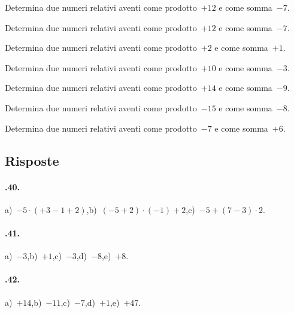 \begin{multicols}{2}
\begin{esercizio}
 Determina due numeri relativi aventi come prodotto~$+12$ e come somma~$-7$.
\end{esercizio}

\begin{esercizio}
 Determina due numeri relativi aventi come
prodotto~$+12$ e come somma~$-7$.
\end{esercizio}

\begin{esercizio}
 Determina due numeri relativi aventi come
prodotto~$+2$ e come somma~$+1$.
\end{esercizio}

\begin{esercizio}
 Determina due numeri relativi aventi come
prodotto~$+10$ e come somma~$-3$.
\end{esercizio}

\begin{esercizio}
 Determina due numeri relativi aventi come
prodotto~$+14$ e come somma~$-9$.
\end{esercizio}

\begin{esercizio}
 Determina due numeri relativi aventi come
prodotto~$-15$ e come somma~$-8$.
\end{esercizio}

\begin{esercizio}
 Determina due numeri relativi aventi come
prodotto~$-7$ e come somma~$+6$.
\end{esercizio}
\end{multicols}
\subsection{Risposte}

\paragraph{\thechapter.40.}
a)~$-5\cdot(+3-1+2)$,\quad b)~$(-5+2)\cdot(-1)+2$,\quad c)~$-5+(7-3)\cdot2$.

\paragraph{\thechapter.41.}
a)~$-3$,\quad b)~$+1$,\quad c)~$-3$,\quad d)~$-8$,\quad e)~$+8$.

\paragraph{\thechapter.42.}
a)~$+14$,\quad b)~$-11$,\quad c)~$-7$,\quad d)~$+1$,\quad e)~$+47$.

